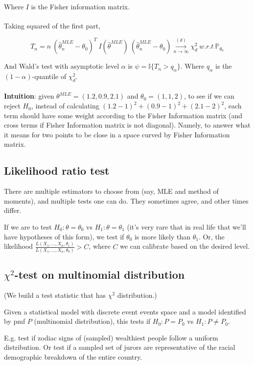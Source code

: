 \documentclass{article}
\begin{document}
Where $I$ is the Fisher information matrix.
\\
\\
Taking squared of the first part,

$$
T_n = n ~ (\hat{\theta}^{MLE}_{n} - \theta_0)^T ~ I(\hat{\theta}^{MLE}) ~ (\hat{\theta}^{MLE}_{n} - \theta_0) \overset{(d)}{\underset{n \to \infty}{\longrightarrow}} \chi^2_d ~ w.r.t ~ \mathbb{P}_{\theta_0}
$$

And Wald's test with asymptotic level $\alpha$ is $\psi = \mathbb{I}\{T_n > q_{\alpha}\}$.
Where $q_{\alpha}$ is the $(1 - \alpha)$-quantile of $\chi_d^2$.
\\
\\
\textbf{Intuition}: given $\theta^{MLE} = (1.2, 0.9, 2.1)$ and $\theta_0 = (1, 1, 2)$, to see if we can reject $H_0$, instead of calculating $(1.2 - 1)^2 + (0.9 - 1)^2 + (2.1 - 2)^2$, each term should have some weight according to the Fisher Information matrix (and cross terms if Fisher Information matrix is not diagonal).
Namely, to answer what it means for two points to be close in a space curved by Fisher Information matrix.

\subsection{Likelihood ratio test}

There are multiple estimators to choose from (say, MLE and method of moments), and multiple tests one can do.
They sometimes agree, and other times differ.

If we are to test $H_0: \theta = \theta_0$ vs $H_1: \theta = \theta_1$ (it's very rare that in real life that we'll have hypotheses of this form), we test if $\theta_0$ is more likely than $\theta_1$.
Or, the likelihood $\frac{L(X_1, \dots, X_n, \theta_1)}{L(X_1, \dots, X_n, \theta_0)} > C$, where $C$ we can calibrate based on the desired level.

\subsection{$\chi^2$-test on multinomial distribution}

(We build a test statistic that has $\chi^2$ distribution.)

Given a statistical model with discrete event events space and a model identified by pmf $P$ (multinomial distribution),
this tests if $H_0: P = P_0$ vs $H_1: P \neq P_0$.

E.g. test if zodiac signs of (sampled) wealthiest people follow a uniform distribution.
Or test if a sampled set of jurors are representative of the racial demographic breakdown of the entire country.
\end{document}
